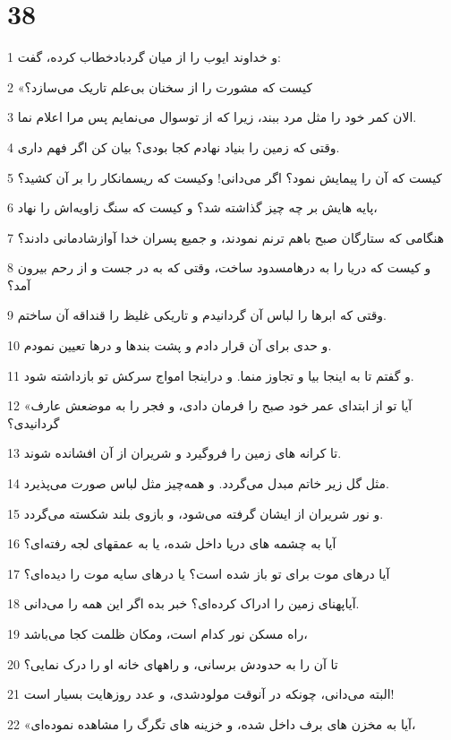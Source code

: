\chapter{38}

\par 1 و خداوند ایوب را از میان گردبادخطاب کرده، گفت:
\par 2 «کیست که مشورت را از سخنان بی‌علم تاریک می‌سازد؟
\par 3 الان کمر خود را مثل مرد ببند، زیرا که از توسوال می‌نمایم پس مرا اعلام نما.
\par 4 وقتی که زمین را بنیاد نهادم کجا بودی؟ بیان کن اگر فهم داری.
\par 5 کیست که آن را پیمایش نمود؟ اگر می‌دانی! وکیست که ریسمانکار را بر آن کشید؟
\par 6 پایه هایش بر چه چیز گذاشته شد؟ و کیست که سنگ زاویه‌اش را نهاد،
\par 7 هنگامی که ستارگان صبح باهم ترنم نمودند، و جمیع پسران خدا آوازشادمانی دادند؟
\par 8 و کیست که دریا را به درهامسدود ساخت، وقتی که به در جست و از رحم بیرون آمد؟
\par 9 وقتی که ابرها را لباس آن گردانیدم و تاریکی غلیظ را قنداقه آن ساختم.
\par 10 و حدی برای آن قرار دادم و پشت بندها و درها تعیین نمودم.
\par 11 و گفتم تا به اینجا بیا و تجاوز منما. و دراینجا امواج سرکش تو بازداشته شود.
\par 12 «آیا تو از ابتدای عمر خود صبح را فرمان دادی، و فجر را به موضعش عارف گردانیدی؟
\par 13 تا کرانه های زمین را فرو‌گیرد و شریران از آن افشانده شوند.
\par 14 مثل گل زیر خاتم مبدل می‌گردد. و همه‌چیز مثل لباس صورت می‌پذیرد.
\par 15 و نور شریران از ایشان گرفته می‌شود، و بازوی بلند شکسته می‌گردد.
\par 16 آیا به چشمه های دریا داخل شده، یا به عمقهای لجه رفته‌ای؟
\par 17 آیا درهای موت برای تو باز شده است؟ یا درهای سایه موت را دیده‌ای؟
\par 18 آیاپهنای زمین را ادراک کرده‌ای؟ خبر بده اگر این همه را می‌دانی.
\par 19 راه مسکن نور کدام است، ومکان ظلمت کجا می‌باشد،
\par 20 تا آن را به حدودش برسانی، و راههای خانه او را درک نمایی؟
\par 21 البته می‌دانی، چونکه در آنوقت مولودشدی، و عدد روزهایت بسیار است! 
\par 22 «آیا به مخزن های برف داخل شده، و خزینه های تگرگ را مشاهده نموده‌ای،
